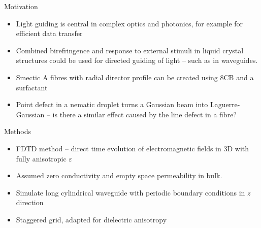 \documentclass[8pt]{beamer}
\newlength{\wideitemsep}
\let\olditem\item
\renewcommand{\item}{\setlength{\itemsep}{\wideitemsep}\olditem}
\newcommand{\blockpadding}{
  \rule[-0.6ex]{0pt}{2.5ex}
}
\begin{document}
\begin{columns}[t]
 \begin{column}{.36\textwidth}
\begin{block}{\blockpadding Motivation}
\begin{itemize}
 \item Light guiding is central in complex optics and photonics, for example for efficient data transfer
 \item Combined birefringence and response to external stimuli in liquid crystal structures could be used for directed guiding of light -- such as in waveguides\citep{lasers}.
 \item Smectic A fibres with radial director profile can be created using 8CB and a surfactant
 \item Point defect in a nematic droplet turns a Gaussian beam into Laguerre-Gaussian\citep{brasselet} -- is there a similar effect caused by the line defect in a fibre?
\end{itemize}
\end{block}

\begin{block}{\blockpadding Methods}
 \begin{itemize}
  \item FDTD method\citep{taflove} -- direct time evolution of electromagnetic fields in 3D with fully anisotropic $\varepsilon$
  \item Assumed zero conductivity and empty space permeability in bulk.
  \item Simulate long cylindrical waveguide with periodic boundary conditions in $z$ direction
  \item Staggered grid, adapted for dielectric anisotropy
  \begin{figure}[h]
\centering
\end{figure}
\end{itemize}
\end{block}
\end{column}
\end{columns}
\end{document}
